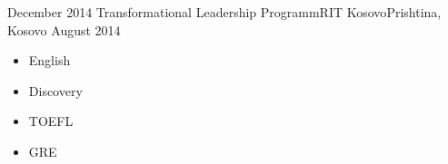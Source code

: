 \begin{experiences}
 \emptySeparator
  \experience
    {December 2014}   {Transformational Leadership Programm}{RIT Kosovo}{Prishtina, Kosovo}
    {August 2014} {
                      \begin{itemize}
                        \item English                        
                        \item Discovery                    
                        \item TOEFL              
                        \item GRE                                                                   
                      \end{itemize}
                    }
                   
\end{experiences}
